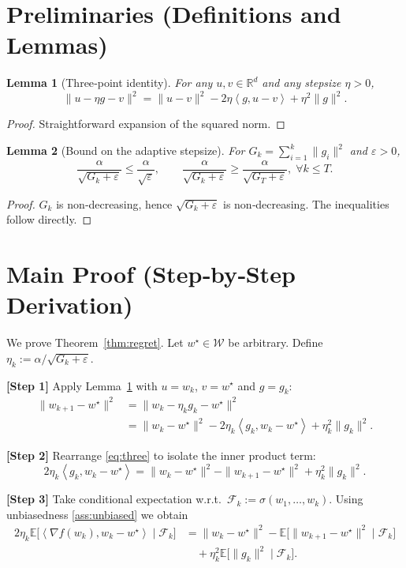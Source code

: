 \documentclass{article}
\newtheorem{lemma}{Lemma}
\newcommand{\E}{\mathbb{E}}
\newcommand{\R}{\mathbb{R}}
\newcommand{\iprod}[2]{\left\langle #1,#2\right\rangle}
\begin{document}
\newpage
\section*{Preliminaries (Definitions and Lemmas)}
\begin{lemma}[Three‑point identity]\label{lem:three}
For any $u,v\in\R^{d}$ and any stepsize $\eta>0$,
\[
\|u-\eta g - v\|^{2}
= \|u-v\|^{2} -2\eta\iprod{g}{u-v} + \eta^{2}\|g\|^{2}.
\]
\end{lemma}
\begin{proof}
Straightforward expansion of the squared norm. \qedhere
\end{proof}
\begin{lemma}[Bound on the adaptive stepsize]\label{lem:stepsize}
For $G_k=\sum_{i=1}^{k}\|g_i\|^{2}$ and $\varepsilon>0$,
\[
\frac{\alpha}{\sqrt{G_k+\varepsilon}}\le\frac{\alpha}{\sqrt{\varepsilon}},\qquad
\frac{\alpha}{\sqrt{G_k+\varepsilon}}\ge\frac{\alpha}{\sqrt{G_T+\varepsilon}},\;\forall k\le T.
\]
\end{lemma}
\begin{proof}
$G_k$ is non‑decreasing, hence $\sqrt{G_k+\varepsilon}$ is non‑decreasing. The inequalities follow directly. \qedhere
\end{proof}

\section*{Main Proof (Step‑by‑Step Derivation)}
We prove Theorem~\ref{thm:regret}.  
Let $w^{\star}\in\mathcal{W}$ be arbitrary. Define $\eta_k:=\alpha/\sqrt{G_k+\varepsilon}$.  

\noindent\textbf{[Step 1]} Apply Lemma~\ref{lem:three} with $u=w_k$, $v=w^{\star}$ and $g=g_k$:
\begin{align}
\|w_{k+1}-w^{\star}\|^{2}
&= \|w_k-\eta_k g_k - w^{\star}\|^{2} \nonumber\\
&= \|w_k-w^{\star}\|^{2} -2\eta_k\iprod{g_k}{w_k-w^{\star}} + \eta_k^{2}\|g_k\|^{2}. \label{eq:three}
\end{align}

\noindent\textbf{[Step 2]} Rearrange \eqref{eq:three} to isolate the inner product term:
\begin{equation}
2\eta_k\iprod{g_k}{w_k-w^{\star}}
= \|w_k-w^{\star}\|^{2} - \|w_{k+1}-w^{\star}\|^{2} + \eta_k^{2}\|g_k\|^{2}. \label{eq:inner}
\end{equation}

\noindent\textbf{[Step 3]} Take conditional expectation w.r.t.\ $\mathcal{F}_k:=\sigma(w_1,\dots,w_k)$.
Using unbiasedness \eqref{ass:unbiased} we obtain
\begin{align}
2\eta_k\E\!\big[\iprod{\nabla f(w_k)}{w_k-w^{\star}}\mid\mathcal{F}_k\big]
&= \|w_k-w^{\star}\|^{2} - \E\!\big[\|w_{k+1}-w^{\star}\|^{2}\mid\mathcal{F}_k\big] \nonumber\\
&\quad + \eta_k^{2}\E\!\big[\|g_k\|^{2}\mid\mathcal{F}_k\big]. \label{eq:cond}
\end{align}
\end{document}
